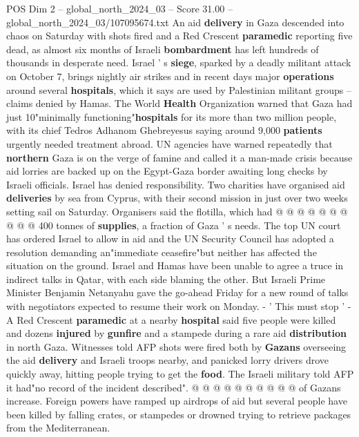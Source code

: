 \begin{textsample}{POS Dim 2 – global\_north\_2024\_03 – Score 31.00 – global\_north\_2024\_03/107095674.txt}  \label{ex:f2_pos_105}
An aid \textbf{delivery} in Gaza descended into chaos on Saturday with shots fired and a Red Crescent \textbf{paramedic} reporting five dead, as almost six months of Israeli \textbf{bombardment} has left hundreds of thousands in desperate need.
Israel ' s \textbf{siege}, sparked by a deadly militant attack on October 7, brings nightly air strikes and in recent days major \textbf{operations} around several \textbf{hospitals}, which it says are used by Palestinian militant groups -- claims denied by Hamas.
The World \textbf{Health} Organization warned that Gaza had just 10"minimally functioning"\textbf{hospitals} for its more than two million people, with its chief Tedros Adhanom Ghebreyesus saying around 9,000 \textbf{patients} urgently needed treatment abroad.
UN agencies have warned repeatedly that \textbf{northern} Gaza is on the verge of famine and called it a man-made crisis because aid lorries are backed up on the Egypt-Gaza border awaiting long checks by Israeli officials.
Israel has denied responsibility.
Two charities have organised aid \textbf{deliveries} by sea from Cyprus, with their second mission in just over two weeks setting sail on Saturday.
Organisers said the flotilla, which had @ @ @ @ @ @ @ @ @ @ 400 tonnes of \textbf{supplies}, a fraction of Gaza ' s needs.
The top UN court has ordered Israel to allow in aid and the UN Security Council has adopted a resolution demanding an"immediate ceasefire"but neither has affected the situation on the ground.
Israel and Hamas have been unable to agree a truce in indirect talks in Qatar, with each side blaming the other.
But Israeli Prime Minister Benjamin Netanyahu gave the go-ahead Friday for a new round of talks with negotiators expected to resume their work on Monday. - ' This must stop ' - A Red Crescent \textbf{paramedic} at a nearby \textbf{hospital} said five people were killed and dozens \textbf{injured} by \textbf{gunfire} and a stampede during a rare aid \textbf{distribution} in north Gaza.
Witnesses told AFP shots were fired both by \textbf{Gazans} overseeing the aid \textbf{delivery} and Israeli troops nearby, and panicked lorry drivers drove quickly away, hitting people trying to get the \textbf{food}.
The Israeli military told AFP it had"no record of the incident described". @ @ @ @ @ @ @ @ @ @ of Gazans increase.
Foreign powers have ramped up airdrops of aid but several people have been killed by falling crates, or stampedes or drowned trying to retrieve packages from the Mediterranean.

\end{textsample}
